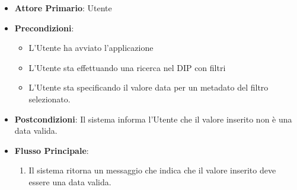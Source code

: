 \begin{itemize}
      \item \textbf{Attore Primario}: Utente
      \item \textbf{Precondizioni}: \begin{itemize}
            \item L'Utente ha avviato l'applicazione
            \item L'Utente sta effettuando una ricerca nel DIP con filtri
            \item L'Utente sta specificando il valore data per un metadato del filtro selezionato.
      \end{itemize}
      \item \textbf{Postcondizioni}: Il sistema informa l'Utente che il valore inserito non è una data valida.
      \item \textbf{Flusso Principale}:
      \begin{enumerate}
            \item Il sistema ritorna un messaggio che indica che il valore inserito deve essere una data valida.
      \end{enumerate}
\end{itemize}